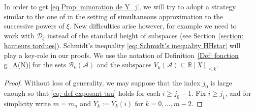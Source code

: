 \documentclass[JEP,XML,SOM,Unicode,NoFloatCountersInSection,published]{cedram}
\newcommand\bR{\mathbb{R}}
\newcommand\cA{\mathcal{A}}
\newcommand\cB{\mathcal{B}}
\newcommand\HHstar{\mathcal{D}_{\xi}}
\let\subset \subseteq
\theoremstyle{definition}
\theoremstyle{plain}
\begin{document}
In order to get \eqref{eq Prop: minoration de Y_j}, we will try to adopt a strategy similar to the one of \hbox{\cite[\S 5]{poels2022simultaneous}} in the setting of simultaneous approximation to the successive powers of $\xi$. New difficulties arise however, for example we need to work with $\HHstar$ instead of the standard height of subspaces (see Section~\ref{section: hauteurs tordues}). Schmidt's inequality \eqref{eq: Schmidt's inequality HHstar} will play a key-role in our proofs. We use the notation of Definition~\ref{Def: fonction g_A(N)} for the sets $\cB_k(\cA)$ and the subspaces $V_k(\cA) \subset \bR[X]_{\leq k}$.

\begin{proof}
Without loss of generality, we may suppose that the index $j_0$ is large enough so that \eqref{eq: def exposant tau} holds for each $i\geq j_0-1$. Fix $i\geq j_1$, and for simplicity write $m=m_n$ and $Y_k:= Y_k(i)$ for $k=0,\dots,m-2$.


\end{proof}
\end{document}
